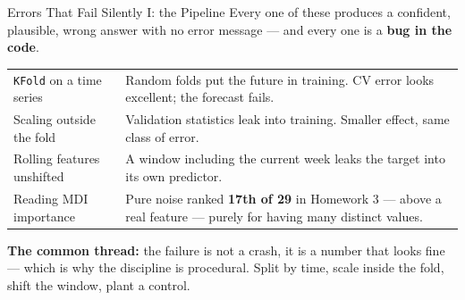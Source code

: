 \documentclass[aspectratio=169, 11pt]{beamer}
\begin{document}
\begin{frame}{Errors That Fail Silently I: the Pipeline}
  Every one of these produces a confident, plausible, wrong answer with no error message ---
  and every one is a \textbf{bug in the code}.
  \begin{center}
    {\small
    \begin{tabular}{p{3.5cm}p{8.8cm}}
      \toprule
      \texttt{KFold} on a time series & Random folds put the future in training. CV error looks
      excellent; the forecast fails. \\[2pt]
      Scaling outside the fold & Validation statistics leak into training. Smaller effect, same
      class of error. \\[2pt]
      Rolling features unshifted & A window including the current week leaks the target into its
      own predictor. \\[2pt]
      Reading MDI importance & Pure noise ranked \textbf{17th of 29} in Homework 3 --- above a
      real feature --- purely for having many distinct values. \\
      \bottomrule
    \end{tabular}
    }
  \end{center}

  \vspace{0.05cm}
  \textbf{The common thread:} the failure is not a crash, it is a number that looks fine --- which
  is why the discipline is procedural. Split by time, scale inside the fold, shift the window,
  plant a control.
\end{frame}
\end{document}
